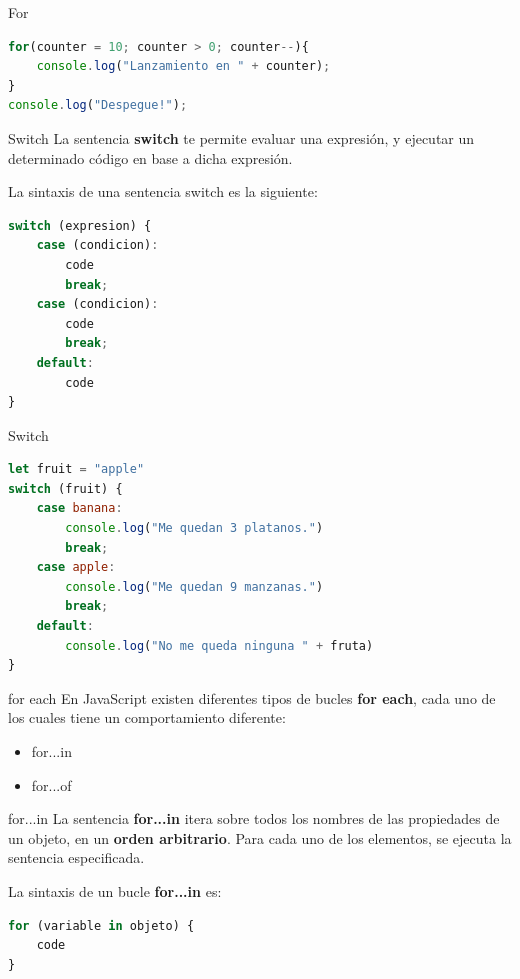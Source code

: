 \documentclass{beamer}
\begin{document}
\begin{frame}[fragile]{For}
\begin{lstlisting}[language=JavaScript]
for(counter = 10; counter > 0; counter--){
    console.log("Lanzamiento en " + counter);
}
console.log("Despegue!");
\end{lstlisting}
\end{frame}

\begin{frame}[fragile]{Switch}
La sentencia \textbf{switch} te permite evaluar una expresión, y ejecutar un determinado código en base a dicha expresión. \pause

La sintaxis de una sentencia switch es la siguiente:

\begin{lstlisting}[language=JavaScript]
switch (expresion) {
    case (condicion): 
        code
        break;
    case (condicion):
        code
        break;
    default:
        code
}\end{lstlisting}
\end{frame}

\begin{frame}[fragile]{Switch}
\begin{lstlisting}[language=JavaScript]
let fruit = "apple"
switch (fruit) {
    case banana: 
        console.log("Me quedan 3 platanos.")
        break;
    case apple:
        console.log("Me quedan 9 manzanas.")
        break;
    default:
        console.log("No me queda ninguna " + fruta)
}\end{lstlisting}
\end{frame}

\begin{frame}[fragile]{for each}
En JavaScript existen diferentes tipos de bucles \textbf{for each}, cada uno de los cuales tiene un comportamiento diferente: \pause
\begin{itemize}
     \item for...in
    \item for...of
   
\end{itemize}
\end{frame}


\begin{frame}[fragile]{for...in}
La sentencia \textbf{for...in} itera sobre todos los nombres de las propiedades de un objeto, en un \textbf{orden arbitrario}. Para cada uno de los elementos, se ejecuta la sentencia especificada. \pause

La sintaxis de un bucle \textbf{for...in} es:
\begin{lstlisting}[language=JavaScript]
for (variable in objeto) {
    code
}
\end{lstlisting}
\end{frame}
\end{document}
